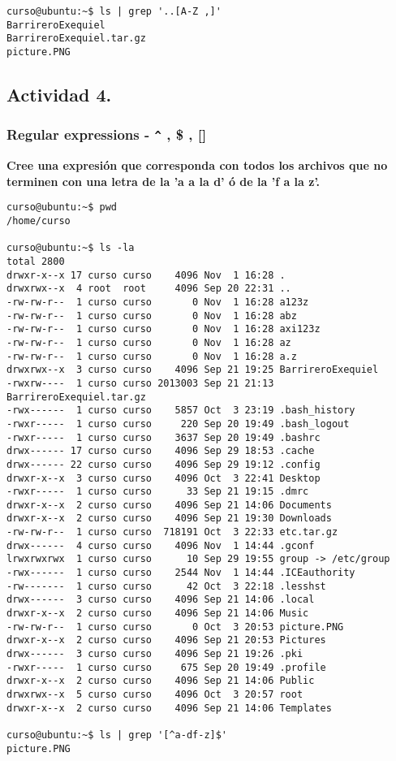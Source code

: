 \documentclass[a4paper,11pt,spanish]{article} %
\newenvironment{myscriptlisting}
{\begin{list}{}{\setlength{\leftmargin}{1em}}\item\scriptsize\bfseries}
{\end{list}}
\begin{document}
\begin{myscriptlisting}
 \begin{verbatim}
curso@ubuntu:~$ ls | grep '..[A-Z ,]'
BarrireroExequiel
BarrireroExequiel.tar.gz
picture.PNG
\end{verbatim}
\end{myscriptlisting}

\subsection{Actividad 4.}

\subsubsection{Regular expressions - \texttt{\^} , \$ , []}

\textbf{Cree una expresión que corresponda con todos los archivos que no 
terminen con una letra de la 'a a la d' ó de la 'f a la z'.}

\begin{myscriptlisting}
 \begin{verbatim}
curso@ubuntu:~$ pwd
/home/curso

curso@ubuntu:~$ ls -la
total 2800
drwxr-x--x 17 curso curso    4096 Nov  1 16:28 .
drwxrwx--x  4 root  root     4096 Sep 20 22:31 ..
-rw-rw-r--  1 curso curso       0 Nov  1 16:28 a123z
-rw-rw-r--  1 curso curso       0 Nov  1 16:28 abz
-rw-rw-r--  1 curso curso       0 Nov  1 16:28 axi123z
-rw-rw-r--  1 curso curso       0 Nov  1 16:28 az
-rw-rw-r--  1 curso curso       0 Nov  1 16:28 a.z
drwxrwx--x  3 curso curso    4096 Sep 21 19:25 BarrireroExequiel
-rwxrw----  1 curso curso 2013003 Sep 21 21:13 BarrireroExequiel.tar.gz
-rwx------  1 curso curso    5857 Oct  3 23:19 .bash_history
-rwxr-----  1 curso curso     220 Sep 20 19:49 .bash_logout
-rwxr-----  1 curso curso    3637 Sep 20 19:49 .bashrc
drwx------ 17 curso curso    4096 Sep 29 18:53 .cache
drwx------ 22 curso curso    4096 Sep 29 19:12 .config
drwxr-x--x  3 curso curso    4096 Oct  3 22:41 Desktop
-rwxr-----  1 curso curso      33 Sep 21 19:15 .dmrc
drwxr-x--x  2 curso curso    4096 Sep 21 14:06 Documents
drwxr-x--x  2 curso curso    4096 Sep 21 19:30 Downloads
-rw-rw-r--  1 curso curso  718191 Oct  3 22:33 etc.tar.gz
drwx------  4 curso curso    4096 Nov  1 14:44 .gconf
lrwxrwxrwx  1 curso curso      10 Sep 29 19:55 group -> /etc/group
-rwx------  1 curso curso    2544 Nov  1 14:44 .ICEauthority
-rw-------  1 curso curso      42 Oct  3 22:18 .lesshst
drwx------  3 curso curso    4096 Sep 21 14:06 .local
drwxr-x--x  2 curso curso    4096 Sep 21 14:06 Music
-rw-rw-r--  1 curso curso       0 Oct  3 20:53 picture.PNG
drwxr-x--x  2 curso curso    4096 Sep 21 20:53 Pictures
drwx------  3 curso curso    4096 Sep 21 19:26 .pki
-rwxr-----  1 curso curso     675 Sep 20 19:49 .profile
drwxr-x--x  2 curso curso    4096 Sep 21 14:06 Public
drwxrwx--x  5 curso curso    4096 Oct  3 20:57 root
drwxr-x--x  2 curso curso    4096 Sep 21 14:06 Templates
 
curso@ubuntu:~$ ls | grep '[^a-df-z]$'
picture.PNG
\end{verbatim}
\end{myscriptlisting}
\end{document}
